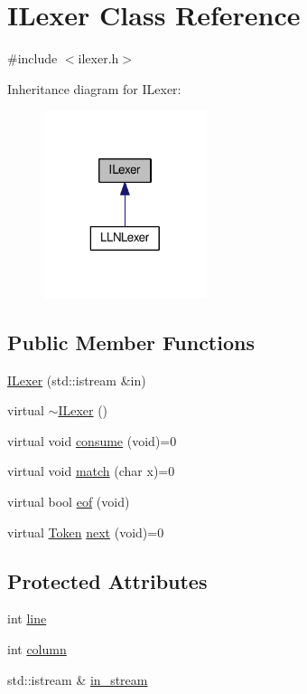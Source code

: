 \hypertarget{class_i_lexer}{\section{I\-Lexer Class Reference}
\label{class_i_lexer}
}


{\ttfamily \#include $<$ilexer.\-h$>$}



Inheritance diagram for I\-Lexer\-:
\nopagebreak
\begin{figure}[H]
\begin{center}
\leavevmode
\includegraphics[width=136pt]{class_i_lexer__inherit__graph}
\end{center}
\end{figure}
\subsection*{Public Member Functions}
\begin{DoxyCompactItemize}
\item 
\hyperlink{class_i_lexer_a204cc87b6147aa741d8fde4825843761}{I\-Lexer} (std\-::istream \&in)
\item 
virtual \hyperlink{class_i_lexer_a1018ca7c4ec102150fe2f6acfe38929d}{$\sim$\-I\-Lexer} ()
\item 
virtual void \hyperlink{class_i_lexer_ae1009b9b2a1e023e1a7d2fd75806607f}{consume} (void)=0
\item 
virtual void \hyperlink{class_i_lexer_a556fdc7b13486f03cb7c3d7d4612666c}{match} (char x)=0
\item 
virtual bool \hyperlink{class_i_lexer_a0366072c45083ee20123f2552a95b6e0}{eof} (void)
\item 
virtual \hyperlink{class_token}{Token} \hyperlink{class_i_lexer_a6f5098fda43f68b01d2e7a2a7158c50d}{next} (void)=0
\end{DoxyCompactItemize}
\subsection*{Protected Attributes}
\begin{DoxyCompactItemize}
\item 
int \hyperlink{class_i_lexer_a5d766f4f4dcc976553ab17a5753ef8ff}{line}
\item 
int \hyperlink{class_i_lexer_a05ce2bfa3595f992618d2a328b66bdfb}{column}
\item 
std\-::istream \& \hyperlink{class_i_lexer_a02d418cc6fdcbfbf6cad7bf914cce77f}{in\-\_\-stream}
\end{DoxyCompactItemize}


